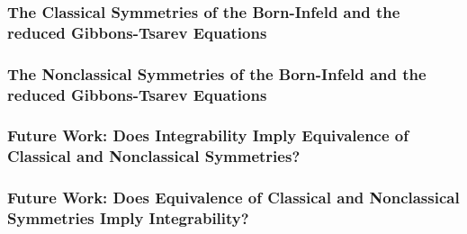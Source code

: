 \documentclass{beamer}
\begin{document}
\begin{frame}
    \frametitle{The Classical Symmetries of the Born-Infeld and the reduced Gibbons-Tsarev Equations}

\end{frame}



\begin{frame}
    \frametitle{The Nonclassical Symmetries of the Born-Infeld and the reduced Gibbons-Tsarev Equations}

\end{frame}



\begin{frame}
    \frametitle{Future Work: Does Integrability Imply Equivalence of Classical and Nonclassical Symmetries?}

\end{frame}



\begin{frame}
    \frametitle{Future Work: Does Equivalence of Classical and Nonclassical Symmetries Imply Integrability?}

\end{frame}
\end{document}
